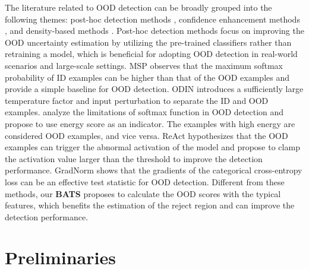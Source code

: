 \documentclass{article}
\begin{document}
The literature related to OOD detection can be broadly grouped into the following themes: post-hoc detection methods \cite{liu2020energy,hendrycks17baseline,ODIN,sun2021react,Mahalanobis,huang2021importance,wang2021can}, confidence enhancement methods \cite{thulasidasan2019mixup,papadopoulos2021outlier,hein2019relu,bitterwolf2020certifiably,hendrycks*2020augmix,yun2019cutmix,hendrycks2018deep,chen2021atom}, and density-based methods \cite{kobyzev2020normalizing,zisselman2020deep,serra2019input,xiao2020likelihood,nalisnick2018deep,kirichenko2020normalizing}. 
Post-hoc detection methods focus on improving the OOD uncertainty estimation by utilizing the pre-trained classifiers rather than retraining a model, which is beneficial for adopting OOD detection in real-world scenarios and large-scale settings. MSP \cite{hendrycks17baseline} observes that the maximum softmax probability of ID examples can be higher than that of the OOD examples and provide a simple baseline for OOD detection. ODIN \cite{ODIN} introduces a {sufficiently large} temperature factor and input perturbation to separate the ID and OOD examples. \citet{liu2020energy} analyze the limitations of softmax function in OOD detection and propose to use energy score as an indicator. The examples with high energy are considered OOD examples, and vice versa.
ReAct \cite{sun2021react} hypothesizes that the OOD examples can trigger the abnormal activation of the model and propose to clamp the activation value larger than the threshold to improve the detection performance.
GradNorm \cite{huang2021importance} shows that the gradients of the categorical cross-entropy loss can be an effective test statistic for OOD detection.
{Different from these methods, our \textbf{BATS} proposes to calculate the OOD scores with the typical features, which benefits the estimation of the reject region and can improve the detection performance.} 

\section{Preliminaries}
\end{document}

